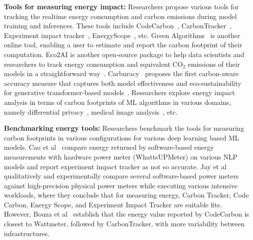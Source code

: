 \textbf{Tools for measuring energy impact:}
%
Researchers propose various tools for tracking the realtime energy consumption and carbon
emissions during model training and inferences. These tools include CodeCarbon~\cite{codecarbon}, CarbonTracker~\cite{anthony2020carbontracker}, Experiment impact tracker~\cite{henderson2020towards}, EnergyScope~\cite{limpens2019energyscope}, etc. 
%
Green Algorithms~\cite{lannelongue2021green} is another online tool, enabling a user to estimate and report the carbon footprint of their computation. Eco2AI is another open-source package to help data scientists and researchers to track energy consumption and equivalent CO$_2$ emissions of their models in a straightforward way~\cite{budennyy2022eco2ai}. %
Carburacy~\cite{moro2023carburacy} proposes the first carbon-aware accuracy measure that captures both model effectiveness and eco-sustainability for generative transformer-based models~\cite{moro2023carburacy}. 
%
Researchers explore energy impact analysis in terms of carbon footprints of ML algorithms in various domains, namely differential privacy~\cite{naidu2021towards}, medical image analysis~\cite{selvan2022carbon}, etc. 

\textbf{Benchmarking energy tools:} Researchers benchmark the tools for measuring carbon footprints in various configurations for various deep learning based ML models. 
Cao et al~\cite{cao2020towards} compare energy returned by software-based energy measurements with hardware power meter (WhattsUPMeter) on various NLP models and report experiment impact tracker as not so accurate. 
%
Jay et al~\cite{jay2023experimental} qualitatively and experimentally compare several software-based power meters
against high-precision physical power meters while executing various intensive workloads, where they conclude that for measuring energy, Carbon Tracker, Code Carbon, Energy Scope, and Experiment Impact Tracker are suitable fits. However, Bouza et al~\cite{bouza2023estimate} establish that the energy value reported by CodeCarbon is closest to Wattmeter, followed by CarbonTracker, with more variability between infrastructures. 

